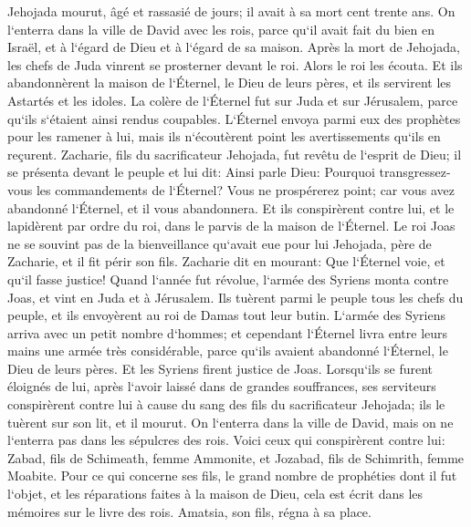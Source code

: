\verse Jehojada mourut, âgé et rassasié de jours; il avait à sa mort cent trente ans. 
\verse On l`enterra dans la ville de David avec les rois, parce qu`il avait fait du bien en Israël, et à l`égard de Dieu et à l`égard de sa maison. 
\verse Après la mort de Jehojada, les chefs de Juda vinrent se prosterner devant le roi. Alors le roi les écouta. 
\verse Et ils abandonnèrent la maison de l`Éternel, le Dieu de leurs pères, et ils servirent les Astartés et les idoles. La colère de l`Éternel fut sur Juda et sur Jérusalem, parce qu`ils s`étaient ainsi rendus coupables. 
\verse L`Éternel envoya parmi eux des prophètes pour les ramener à lui, mais ils n`écoutèrent point les avertissements qu`ils en reçurent. 
\verse Zacharie, fils du sacrificateur Jehojada, fut revêtu de l`esprit de Dieu; il se présenta devant le peuple et lui dit: Ainsi parle Dieu: Pourquoi transgressez-vous les commandements de l`Éternel? Vous ne prospérerez point; car vous avez abandonné l`Éternel, et il vous abandonnera. 
\verse Et ils conspirèrent contre lui, et le lapidèrent par ordre du roi, dans le parvis de la maison de l`Éternel. 
\verse Le roi Joas ne se souvint pas de la bienveillance qu`avait eue pour lui Jehojada, père de Zacharie, et il fit périr son fils. Zacharie dit en mourant: Que l`Éternel voie, et qu`il fasse justice! 
\verse Quand l`année fut révolue, l`armée des Syriens monta contre Joas, et vint en Juda et à Jérusalem. Ils tuèrent parmi le peuple tous les chefs du peuple, et ils envoyèrent au roi de Damas tout leur butin. 
\verse L`armée des Syriens arriva avec un petit nombre d`hommes; et cependant l`Éternel livra entre leurs mains une armée très considérable, parce qu`ils avaient abandonné l`Éternel, le Dieu de leurs pères. Et les Syriens firent justice de Joas. 
\verse Lorsqu`ils se furent éloignés de lui, après l`avoir laissé dans de grandes souffrances, ses serviteurs conspirèrent contre lui à cause du sang des fils du sacrificateur Jehojada; ils le tuèrent sur son lit, et il mourut. On l`enterra dans la ville de David, mais on ne l`enterra pas dans les sépulcres des rois. 
\verse Voici ceux qui conspirèrent contre lui: Zabad, fils de Schimeath, femme Ammonite, et Jozabad, fils de Schimrith, femme Moabite. 
\verse Pour ce qui concerne ses fils, le grand nombre de prophéties dont il fut l`objet, et les réparations faites à la maison de Dieu, cela est écrit dans les mémoires sur le livre des rois. Amatsia, son fils, régna à sa place. 

\chapter{}

